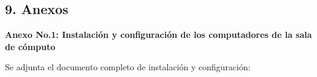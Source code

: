 \begin{spacing}{1.5}
  \begin{tightcenter}
    \section{9. Anexos}
    \mylinespacing
  \end{tightcenter}

  \textbf{Anexo No.1: Instalación y configuración de los computadores de la
    sala de cómputo}

  Se adjunta el documento completo de instalación y configuración:

  \mylinespacing
  \mylinespacing
  \begin{tightcenter}
  \end{tightcenter}
\end{spacing}